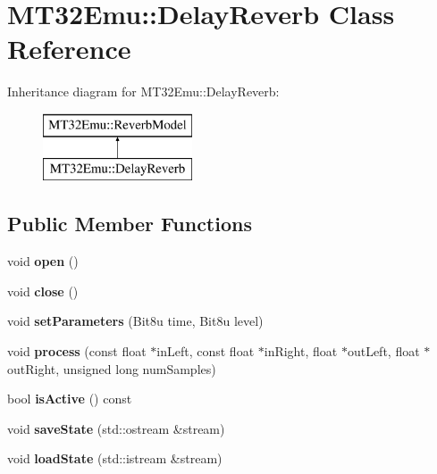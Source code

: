 \hypertarget{classMT32Emu_1_1DelayReverb}{\section{M\-T32\-Emu\-:\-:Delay\-Reverb Class Reference}
\label{classMT32Emu_1_1DelayReverb}
}
Inheritance diagram for M\-T32\-Emu\-:\-:Delay\-Reverb\-:\begin{figure}[H]
\begin{center}
\leavevmode
\includegraphics[height=2.000000cm]{classMT32Emu_1_1DelayReverb}
\end{center}
\end{figure}
\subsection*{Public Member Functions}
\begin{DoxyCompactItemize}
\item 
\hypertarget{classMT32Emu_1_1DelayReverb_a92875ff0c0c80cf353fa6888528f4a24}{void {\bfseries open} ()}\label{classMT32Emu_1_1DelayReverb_a92875ff0c0c80cf353fa6888528f4a24}

\item 
\hypertarget{classMT32Emu_1_1DelayReverb_adafac25a05283bc227684b2ed14c21ff}{void {\bfseries close} ()}\label{classMT32Emu_1_1DelayReverb_adafac25a05283bc227684b2ed14c21ff}

\item 
\hypertarget{classMT32Emu_1_1DelayReverb_ae43d3b33808ca3b2e356b385d787eaa9}{void {\bfseries set\-Parameters} (Bit8u time, Bit8u level)}\label{classMT32Emu_1_1DelayReverb_ae43d3b33808ca3b2e356b385d787eaa9}

\item 
\hypertarget{classMT32Emu_1_1DelayReverb_ad5e1c9b99b54bcfc4d5d3b120ba9c4b2}{void {\bfseries process} (const float $\ast$in\-Left, const float $\ast$in\-Right, float $\ast$out\-Left, float $\ast$out\-Right, unsigned long num\-Samples)}\label{classMT32Emu_1_1DelayReverb_ad5e1c9b99b54bcfc4d5d3b120ba9c4b2}

\item 
\hypertarget{classMT32Emu_1_1DelayReverb_a16f54dfe045c7f14bd25b0ea5d83f318}{bool {\bfseries is\-Active} () const }\label{classMT32Emu_1_1DelayReverb_a16f54dfe045c7f14bd25b0ea5d83f318}

\item 
\hypertarget{classMT32Emu_1_1DelayReverb_a15744156c4731b89fea76c64f40e5e47}{void {\bfseries save\-State} (std\-::ostream \&stream)}\label{classMT32Emu_1_1DelayReverb_a15744156c4731b89fea76c64f40e5e47}

\item 
\hypertarget{classMT32Emu_1_1DelayReverb_a5dae7f886269ad072d570c0db204e2b0}{void {\bfseries load\-State} (std\-::istream \&stream)}\label{classMT32Emu_1_1DelayReverb_a5dae7f886269ad072d570c0db204e2b0}

\end{DoxyCompactItemize}


